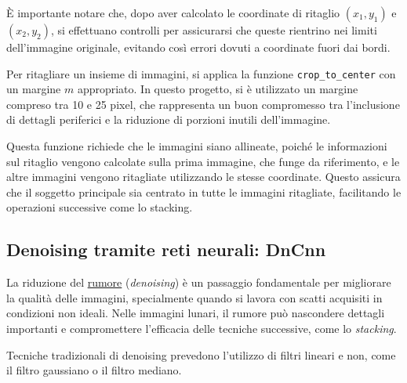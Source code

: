 È importante notare che, dopo aver calcolato le coordinate di ritaglio $(x_1, y_1)$ e $(x_2, y_2)$, si effettuano controlli per assicurarsi che queste rientrino nei limiti dell'immagine originale, evitando così errori dovuti a coordinate fuori dai bordi.

Per ritagliare un insieme di immagini, si applica la funzione \texttt{crop\_to\_center} con un margine $m$ appropriato. In questo progetto, si è utilizzato un margine compreso tra 10 e 25 pixel, che rappresenta un buon compromesso tra l'inclusione di dettagli periferici e la riduzione di porzioni inutili dell'immagine.

Questa funzione richiede che le immagini siano allineate, poiché le informazioni sul ritaglio vengono calcolate sulla prima immagine, che funge da riferimento, e le altre immagini vengono ritagliate utilizzando le stesse coordinate. Questo assicura che il soggetto principale sia centrato in tutte le immagini ritagliate, facilitando le operazioni successive come lo stacking.

\subsection{Denoising tramite reti neurali: DnCnn} \label{subsec:denoising}

La riduzione del \hyperref[sec:noise]{rumore} (\textit{denoising}) è un passaggio fondamentale per migliorare la qualità delle immagini, specialmente quando si lavora con scatti acquisiti in condizioni non ideali. Nelle immagini lunari, il rumore può nascondere dettagli importanti e compromettere l'efficacia delle tecniche successive, come lo \textit{stacking}.

Tecniche tradizionali di denoising prevedono l'utilizzo di filtri lineari e non, come il filtro gaussiano o il filtro mediano.

